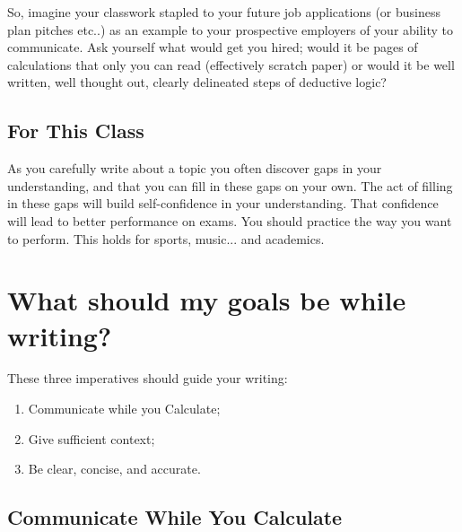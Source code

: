\documentclass[12pt]{article}
\begin{document}
So, imagine your classwork stapled to your future job applications (or business plan pitches etc..) as an example to your prospective employers of your ability to communicate. 
Ask yourself what would get you hired; 
would it be pages of calculations that only you can read (effectively scratch paper) or would it be well written, well thought out, clearly delineated steps of deductive logic?

\subsection*{For This Class}
As you carefully write about a topic you often discover gaps in your understanding, and that you can fill in these gaps on your own. The act of filling in these gaps will build self-confidence in your understanding. That confidence will lead to better performance on exams. 
You should practice the way you want to perform. 
This holds for sports, music...  and academics.


\section*{What should my goals be while writing?}
These three imperatives should guide your writing: 

\begin{enumerate} 
\item Communicate while you Calculate;
\item Give sufficient context;
\item Be clear, concise, and accurate.
\end{enumerate} 


\subsection{Communicate While You Calculate}
%
%
\end{document}
